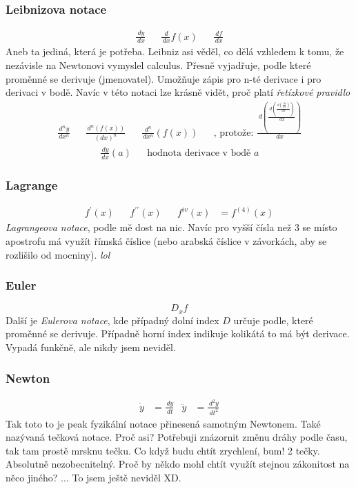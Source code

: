 \documentclass[12pt]{article}
\begin{document}
\subsubsection{Leibnizova notace}
\begin{align}
\frac{\,dy}{\,dx}&&\frac{\,d}{\,dx}f(x) && \frac{\,df}{\,dx}
\end{align}
Aneb ta jediná, která je potřeba. Leibniz asi věděl, co dělá vzhledem k tomu, že nezávisle na Newtonovi vymyslel calculus. Přesně vyjadřuje, podle které proměnné se derivuje (jmenovatel). Umožňuje zápis pro n-té derivace i pro derivaci v bodě. Navíc v této notaci lze krásně vidět, proč platí \emph{řetízkové pravidlo}
\begin{align}
\frac{\,d^n y}{\,dx^n} && \frac{\,d^n(f(x))}{(dx)^n} && \frac{\,d^n}{\,dx^n}(f(x)) && \text{, protože: } \frac{\,d\left(\frac{\,d(\frac{\,d(\frac{\,dy}{\,dx})}{\,dx})}{\,dx}\right)}{\,dx}
\end{align}
\begin{align}
\frac{\,dy}{\,dx}(a) && \text{hodnota derivace v bodě $a$}
\end{align}

\subsubsection{Lagrange}
\begin{align}
f^{\prime}(x) && f^{\prime\prime}(x) && f^{iv}(x)&=f^{(4)}(x)
\end{align}
\emph{Lagrangeova notace}, podle mě dost na nic. Navíc pro vyšší čísla než 3 se místo apostrofu má využít římská číslice (nebo arabská číslice v závorkách, aby se rozlišilo od mocniny). \textit{lol}
\subsubsection{Euler}
\begin{equation}
D_x f
\end{equation}
Další je \emph{Eulerova notace}, kde případný dolní index $D$ určuje podle, které proměnné se derivuje. Případně horní index indikuje kolikátá to má být derivace. Vypadá funkčně, ale nikdy jsem neviděl.
\subsubsection{Newton}
\begin{align}
\dot{y} &= \frac{\,dy}{\,dt} & \ddot{y} &= \frac{\,d^2y}{\,dt^2}
\end{align}
Tak toto to je peak fyzikální notace přinesená samotným Newtonem. Také nazývaná tečková notace. Proč asi? Potřebuji znázornit změnu dráhy podle času, tak tam prostě mrsknu tečku. Co když budu chtít zrychlení, bum! 2 tečky.  Absolutně nezobecnitelný. Proč by někdo mohl chtít využít stejnou zákonitost na něco jiného? ... To jsem ještě neviděl XD.
\end{document}
